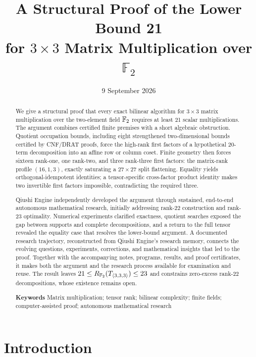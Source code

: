 \documentclass[11pt,a4paper]{article}
\title{A Structural Proof of the Lower Bound 21\\
for $3\times3$ Matrix Multiplication over $\mathbb{F}_2$}
\date{9 September 2026}
\begin{document}
\maketitle
\thispagestyle{plain}
\begin{abstract}
We give a structural proof that every exact bilinear algorithm for $3\times3$
matrix multiplication over the two-element field $\mathbb{F}_2$ requires at least
21 scalar multiplications. The argument combines certified finite premises
with a short algebraic obstruction. Quotient occupation bounds, including
eight strengthened two-dimensional bounds certified by CNF/DRAT proofs,
force the high-rank first factors of a hypothetical 20-term decomposition
into an affine row or column coset. Finite geometry then forces sixteen
rank-one, one rank-two, and three rank-three first factors: the
matrix-rank profile $(16,1,3)$, exactly saturating a $27\times27$ split
flattening. Equality yields orthogonal-idempotent identities; a
tensor-specific cross-factor product identity makes two invertible first
factors impossible, contradicting the required three.

Qiushi Engine independently developed the argument through sustained,
end-to-end autonomous mathematical research, initially addressing rank-22
construction and rank-23 optimality.
Numerical experiments clarified exactness, quotient searches exposed the
gap between supports and complete decompositions, and a return to the
full tensor revealed the equality case that resolves the lower-bound
argument. A documented research trajectory, reconstructed from Qiushi
Engine's research memory, connects the evolving questions, experiments,
corrections, and mathematical insights that led to the proof.
Together with the accompanying notes, programs, results, and proof
certificates, it makes both the argument and the research process
available for examination and reuse. The result leaves
$21\le R_{\mathbb{F}_2}(T_{\langle3,3,3\rangle})\le23$ and constrains zero-excess rank-22
decompositions, whose existence remains open.
\par\smallskip\noindent\textbf{Keywords}\quad
Matrix multiplication; tensor rank; bilinear complexity; finite fields;
computer-assisted proof; autonomous mathematical research
\end{abstract}
{\tableofcontents\par}
\clearpage

\section{Introduction}
\end{document}
